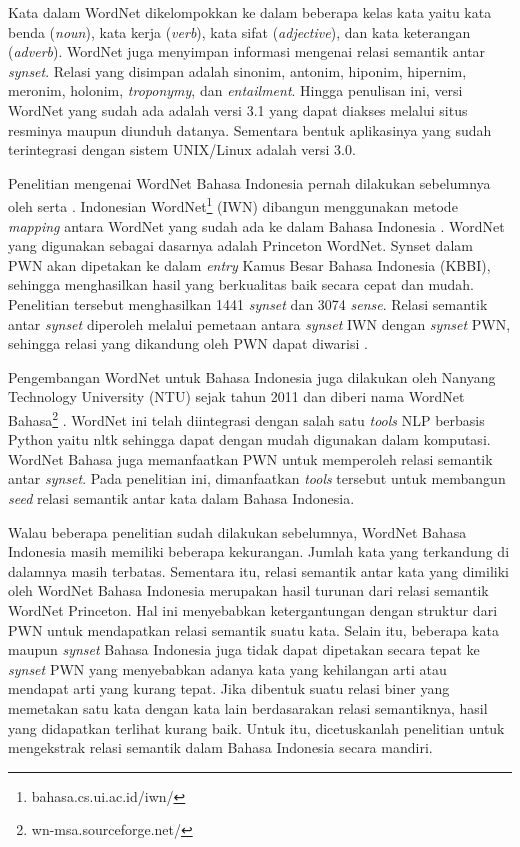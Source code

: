 Kata dalam WordNet dikelompokkan ke dalam beberapa kelas kata yaitu kata benda (\textit{noun}), kata kerja (\textit{verb}), kata sifat (\textit{adjective}), dan kata keterangan (\textit{adverb}). WordNet juga menyimpan informasi mengenai relasi semantik antar \textit{synset}. Relasi yang disimpan adalah sinonim, antonim, hiponim, hipernim, meronim, holonim, \textit{troponymy}, dan \textit{entailment}. Hingga penulisan ini, versi WordNet yang sudah ada adalah versi 3.1 yang dapat diakses melalui situs resminya maupun diunduh datanya. Sementara bentuk aplikasinya yang sudah terintegrasi dengan sistem UNIX/Linux adalah versi 3.0. 

Penelitian mengenai WordNet Bahasa Indonesia pernah dilakukan sebelumnya oleh \cite{putra2008building} serta \cite{margaretha2008comparing}. Indonesian WordNet\footnote{bahasa.cs.ui.ac.id/iwn/} (IWN) dibangun menggunakan metode \textit{mapping} antara WordNet yang sudah ada ke dalam Bahasa Indonesia \citep{putra2008building}. WordNet yang digunakan sebagai dasarnya adalah Princeton WordNet. Synset dalam PWN akan dipetakan ke dalam \textit{entry} Kamus Besar Bahasa Indonesia (KBBI), sehingga menghasilkan hasil yang berkualitas baik secara cepat dan mudah. Penelitian tersebut menghasilkan 1441 \textit{synset} dan 3074 \textit{sense}. Relasi semantik antar \textit{synset} diperoleh melalui pemetaan antara \textit{synset} IWN dengan \textit{synset} PWN, sehingga relasi yang dikandung oleh PWN dapat diwarisi .

Pengembangan WordNet untuk Bahasa Indonesia juga dilakukan oleh Nanyang Technology University (NTU) sejak tahun 2011 dan diberi nama WordNet Bahasa\footnote{wn-msa.sourceforge.net/} \citep{noor2011creating}. WordNet ini telah diintegrasi dengan salah satu \textit{tools} NLP berbasis Python yaitu nltk sehingga dapat dengan mudah digunakan dalam komputasi. WordNet Bahasa juga memanfaatkan PWN untuk memperoleh relasi semantik antar \textit{synset}. Pada penelitian ini, dimanfaatkan \textit{tools} tersebut untuk membangun \textit{seed} relasi semantik antar kata dalam Bahasa Indonesia.

Walau beberapa penelitian sudah dilakukan sebelumnya, WordNet Bahasa Indonesia masih memiliki beberapa kekurangan. Jumlah kata yang terkandung di dalamnya masih terbatas. Sementara itu, relasi semantik antar kata yang dimiliki oleh WordNet Bahasa Indonesia merupakan hasil turunan dari relasi semantik WordNet Princeton. Hal ini menyebabkan ketergantungan dengan struktur dari PWN untuk mendapatkan relasi semantik suatu kata. Selain itu, beberapa kata maupun \textit{synset} Bahasa Indonesia juga tidak dapat dipetakan secara tepat ke \textit{synset} PWN yang menyebabkan adanya kata yang kehilangan arti atau mendapat arti yang kurang tepat. Jika dibentuk suatu relasi biner yang memetakan satu kata dengan kata lain berdasarakan relasi semantiknya, hasil yang didapatkan terlihat kurang baik. Untuk itu, dicetuskanlah penelitian untuk mengekstrak relasi semantik dalam Bahasa Indonesia secara mandiri. 

